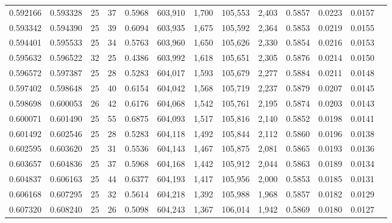 \begin{tabular}{rrrrrrrrrrrrr}
0.592166 & 0.593328 &    25 &  37 &                                     0.5968 & 603,910 &   1,700 & 105,553 &   2,403 & 0.5857 & 0.0223 & 0.0157 \\
0.593342 & 0.594390 &    25 &  39 &                                     0.6094 & 603,935 &   1,675 & 105,592 &   2,364 & 0.5853 & 0.0219 & 0.0155 \\
0.594401 & 0.595533 &    25 &  34 &                                     0.5763 & 603,960 &   1,650 & 105,626 &   2,330 & 0.5854 & 0.0216 & 0.0153 \\
0.595632 & 0.596522 &    32 &  25 &                                     0.4386 & 603,992 &   1,618 & 105,651 &   2,305 & 0.5876 & 0.0214 & 0.0150 \\
0.596572 & 0.597387 &    25 &  28 &                                     0.5283 & 604,017 &   1,593 & 105,679 &   2,277 & 0.5884 & 0.0211 & 0.0148 \\
0.597402 & 0.598648 &    25 &  40 &                                     0.6154 & 604,042 &   1,568 & 105,719 &   2,237 & 0.5879 & 0.0207 & 0.0145 \\
0.598698 & 0.600053 &    26 &  42 &                                     0.6176 & 604,068 &   1,542 & 105,761 &   2,195 & 0.5874 & 0.0203 & 0.0143 \\
0.600071 & 0.601490 &    25 &  55 &                                     0.6875 & 604,093 &   1,517 & 105,816 &   2,140 & 0.5852 & 0.0198 & 0.0141 \\
0.601492 & 0.602546 &    25 &  28 &                                     0.5283 & 604,118 &   1,492 & 105,844 &   2,112 & 0.5860 & 0.0196 & 0.0138 \\
0.602595 & 0.603620 &    25 &  31 &                                     0.5536 & 604,143 &   1,467 & 105,875 &   2,081 & 0.5865 & 0.0193 & 0.0136 \\
0.603657 & 0.604836 &    25 &  37 &                                     0.5968 & 604,168 &   1,442 & 105,912 &   2,044 & 0.5863 & 0.0189 & 0.0134 \\
0.604837 & 0.606163 &    25 &  44 &                                     0.6377 & 604,193 &   1,417 & 105,956 &   2,000 & 0.5853 & 0.0185 & 0.0131 \\
0.606168 & 0.607295 &    25 &  32 &                                     0.5614 & 604,218 &   1,392 & 105,988 &   1,968 & 0.5857 & 0.0182 & 0.0129 \\
0.607320 & 0.608240 &    25 &  26 &                                     0.5098 & 604,243 &   1,367 & 106,014 &   1,942 & 0.5869 & 0.0180 & 0.0127 \\

\end{tabular}

